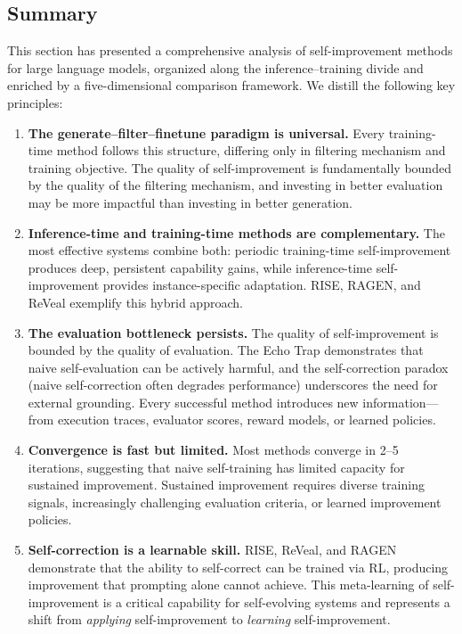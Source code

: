 \subsection{Summary}
\label{sec:methods-summary}

This section has presented a comprehensive analysis of self-improvement methods for large language models, organized along the inference--training divide and enriched by a five-dimensional comparison framework. We distill the following key principles:

\begin{enumerate}
    \item \textbf{The generate--filter--finetune paradigm is universal.} Every training-time method follows this structure, differing only in filtering mechanism and training objective. The quality of self-improvement is fundamentally bounded by the quality of the filtering mechanism, and investing in better evaluation may be more impactful than investing in better generation.

    \item \textbf{Inference-time and training-time methods are complementary.} The most effective systems combine both: periodic training-time self-improvement produces deep, persistent capability gains, while inference-time self-improvement provides instance-specific adaptation. RISE, RAGEN, and ReVeal exemplify this hybrid approach.

    \item \textbf{The evaluation bottleneck persists.} The quality of self-improvement is bounded by the quality of evaluation. The Echo Trap demonstrates that naive self-evaluation can be actively harmful, and the self-correction paradox (naive self-correction often degrades performance) underscores the need for external grounding. Every successful method introduces new information---from execution traces, evaluator scores, reward models, or learned policies.

    \item \textbf{Convergence is fast but limited.} Most methods converge in 2--5 iterations, suggesting that naive self-training has limited capacity for sustained improvement. Sustained improvement requires diverse training signals, increasingly challenging evaluation criteria, or learned improvement policies.

    \item \textbf{Self-correction is a learnable skill.} RISE, ReVeal, and RAGEN demonstrate that the ability to self-correct can be trained via RL, producing improvement that prompting alone cannot achieve. This meta-learning of self-improvement is a critical capability for self-evolving systems and represents a shift from \emph{applying} self-improvement to \emph{learning} self-improvement.


\end{enumerate}
